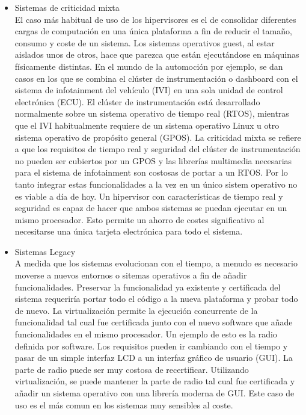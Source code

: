 \begin{itemize}
	\item Sistemas de criticidad mixta\\
	El caso más habitual de uso de los hipervisores es el de consolidar diferentes cargas de computación en una única
	plataforma a fin de reducir el tamaño, consumo y coste de un sistema. Los sistemas operativos guest, al estar aislados unos de otros, hace que parezca que están ejecutándose en máquinas físicamente distintas. En el mundo de la automoción por ejemplo,
	se dan casos en los que se combina el clúster de instrumentación o dashboard con el sistema de infotainment del vehículo (\acrshort{IVI}) en una sola unidad de control electrónica (ECU). El clúster de instrumentación está desarrollado normalmente sobre un sistema operativo de tiempo real (\acrshort{RTOS}), mientras que el \acrshort{IVI} habitualmente requiere de un sistema operativo Linux u otro sistema operativo de propósito general (GPOS). La criticidad mixta se refiere a que los requisitos de tiempo real y seguridad del clúster de instrumentación no pueden ser cubiertos por un GPOS y las librerías multimedia necesarias para el sistema de infotainment son costosas de portar a un \acrshort{RTOS}. Por lo tanto integrar estas funcionalidades a la vez en un único sistem operativo no es viable a día de hoy. Un hipervisor con características de tiempo real y seguridad es capaz de hacer que ambos sistemas se puedan ejecutar en un mismo procesador. Esto permite un ahorro de costes significativo al necesitarse una única tarjeta electrónica para todo el sistema.
	\item Sistemas Legacy\\
	A medida que los sistemas evolucionan con el tiempo, a menudo es necesario moverse a nuevos entornos o sitemas operativos a fin de añadir funcionalidades. Preservar la funcionalidad ya existente y certificada del sistema requeriría portar todo el código a la nueva plataforma y probar todo de nuevo. La virtualización permite la ejecución concurrente de la funcionalidad tal cual fue certificada junto con el nuevo software que añade funcionalidades en el mismo procesador. Un ejemplo de esto es la radio definida por software. Los requisitos pueden ir cambiando con el tiempo y pasar de un simple interfaz LCD a un interfaz gráfico de usuario (GUI). La parte de radio puede ser muy costosa de recertificar. Utilizando virtualización, se puede mantener la parte de radio tal cual fue certificada y añadir un sistema operativo con una librería moderna de GUI.
	Este caso de uso es el más comun en los sistemas muy sensibles al coste.\\[1cm]
\end{itemize}
